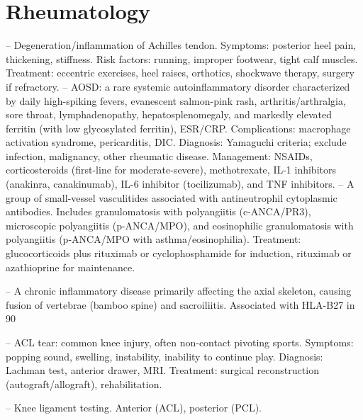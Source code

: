 \chapter{Rheumatology}

-- Degeneration/inflammation of Achilles tendon. Symptoms: posterior heel pain, thickening, stiffness. Risk factors: running, improper footwear, tight calf muscles. Treatment: eccentric exercises, heel raises, orthotics, shockwave therapy, surgery if refractory.
-- AOSD: a rare systemic autoinflammatory disorder characterized by daily high-spiking fevers, evanescent salmon-pink rash, arthritis/arthralgia, sore throat, lymphadenopathy, hepatosplenomegaly, and markedly elevated ferritin (with low glycosylated ferritin), ESR/CRP. Complications: macrophage activation syndrome, pericarditis, DIC. Diagnosis: Yamaguchi criteria; exclude infection, malignancy, other rheumatic disease. Management: NSAIDs, corticosteroids (first-line for moderate-severe), methotrexate, IL-1 inhibitors (anakinra, canakinumab), IL-6 inhibitor (tocilizumab), and TNF inhibitors.
-- A group of small-vessel vasculitides associated with antineutrophil cytoplasmic antibodies. Includes granulomatosis with polyangiitis (c-ANCA/PR3), microscopic polyangiitis (p-ANCA/MPO), and eosinophilic granulomatosis with polyangiitis (p-ANCA/MPO with asthma/eosinophilia). Treatment: glucocorticoids plus rituximab or cyclophosphamide for induction, rituximab or azathioprine for maintenance.

-- A chronic inflammatory disease primarily affecting the axial skeleton, causing fusion of vertebrae (bamboo spine) and sacroiliitis. Associated with HLA-B27 in 90%

-- ACL tear: common knee injury, often non-contact pivoting sports. Symptoms: popping sound, swelling, instability, inability to continue play. Diagnosis: Lachman test, anterior drawer, MRI. Treatment: surgical reconstruction (autograft/allograft), rehabilitation.

-- Knee ligament testing. Anterior (ACL), posterior (PCL).

